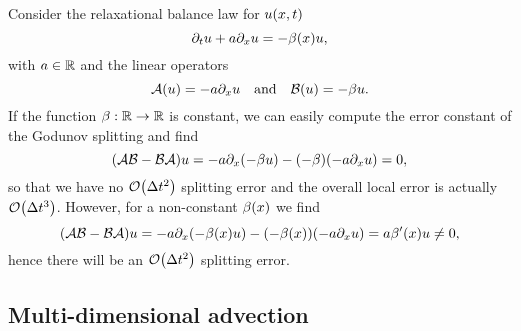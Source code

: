 \begin{example}
	Consider the relaxational balance law for \(u\parentheses*{x, t}\)
	\[
		\partial_t u + a\partial_x u = -\beta\parentheses*{x}u,
	\]
	with \(a \in \mathbb{R}\) and the linear operators
	\[
		\mathcal{A}\parentheses*{u} = -a\partial_x u \quad \text{and} \quad \mathcal{B}\parentheses*{u} = -\beta u.
	\]
	If the function \(\beta: \mathbb{R} \to \mathbb{R}\) is constant, we can easily compute the error constant of the Godunov splitting and find
	\[
		\parentheses*{\mathcal{A}\mathcal{B} - \mathcal{B}\mathcal{A}}u = -a\partial_x \parentheses*{-\beta u} - \parentheses*{-\beta}\parentheses*{-a\partial_x u} = 0,
	\]
	so that we have no \(\mathcal{O}\parentheses*{\Delta t^2}\) splitting error and the overall local error is actually \(\mathcal{O}\parentheses*{\Delta t^3}\).
	However, for a non-constant \(\beta\parentheses*{x}\) we find
	\[
		\parentheses*{\mathcal{A}\mathcal{B} - \mathcal{B}\mathcal{A}}u = -a\partial_x \parentheses*{-\beta\parentheses*{x} u} - \parentheses*{-\beta\parentheses*{x}}\parentheses*{-a\partial_x u} = a\beta'\parentheses*{x}u \ne 0,
	\]
	hence there will be an \(\mathcal{O}\parentheses*{\Delta t^2}\) splitting error.
\end{example}


\subsection{Multi-dimensional advection}

